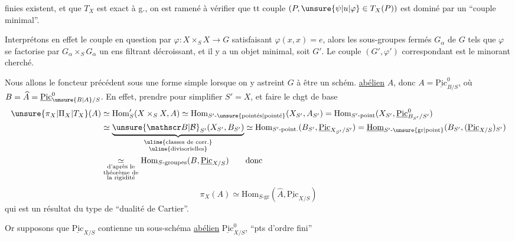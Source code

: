 finies existent, et que $T_X$ est exact à g., on est
ramené à vérifier que tt couple $(P,\unsure{\psi|u|\varphi}\in T_X(P))$
est  dominé par un ``couple minimal''.

Interprétons en effet le couple en question par
$\varphi:X\times_S X\longrightarrow G$ satisfaisant $\varphi(x,x)=e$, alors  les sous-groupes fermés $G_\alpha$ de $G$ tels que $\varphi$ se factorise par $G_\alpha\times_S G_\alpha$
 un ens filtrant décroissant, et 
il y a un objet minimal, soit $G'$. Le couple
$(G',\varphi')$ correspondant est le minorant cherché.

Nous allons
  le foncteur précédent  sous une
forme simple lorsque on y astreint $G$ à être un
schém. \uline{abélien} $A$, donc $A=\underline{\mathrm{Pic}}^0_{B/S}$, où $B=\widehat A=\underline{\mathrm{Pic}}^0_{\unsure{B|A}/S}$.
En effet,  
prendre pour simplifier $S'=X$, et faire le chgt de base  
\[
\begin{aligned}
\unsure{\pi_X|\Pi_X|T_X}(A)&\simeq\mathrm{Hom}'_S(X\times_S X,A)\simeq\mathrm{Hom}_{S'\text{-}\unsure{\mathrm{point\acute es}|\mathrm{point\acute e}}}(X_{S'},A_{S'})=\mathrm{Hom}_{S'\text{-}\mathrm{point}}(X_{S'},\underline{\mathrm{Pic}}^0_{B_{S'}/S'})\\
&\simeq\underbrace{\unsure{\mathscr B|\mathcal B}_{S'}(X_{S'},B_{S'})}_{\substack{\text{\uline{classes de corr.}}\\\text{\uline{divisorielles}}}}\simeq\mathrm{Hom}_{S'\text{-}\mathrm{point.}}(B_{S'},\underline{\mathrm{Pic}}_{X_{S'}/S'})=\underline{\mathrm{Hom}}_{S'\text{-}\unsure{\mathrm{gr}|\mathrm{point}}}(B_{S'},(\underline{\mathrm{Pic}}_{X/S})_{S'})\\
&\underset{\substack{\text{d'après le}\\\text{théorème de}\\\text{la rigidité}}}{\simeq}\mathrm{Hom}_{S\text{-groupes}}(B,\underline{\mathrm{Pic}}_{X/S})\qquad\text{donc}
\end{aligned}
\]
\[
\boxed{\pi_X(A)\simeq\mathrm{Hom}_{S\text{-gr}}(\widehat A,\underline{\mathrm{Pic}}_{X/S})}
\]
qui est un résultat du type de ``dualité de Cartier''.

Or supposons que $\underline{\mathrm{Pic}}_{X/S}$ contienne un sous-schéma
   \uline{abélien} $\underline{\mathrm{Pic}}^0_{X/S}$,    
``pts d'ordre fini''
